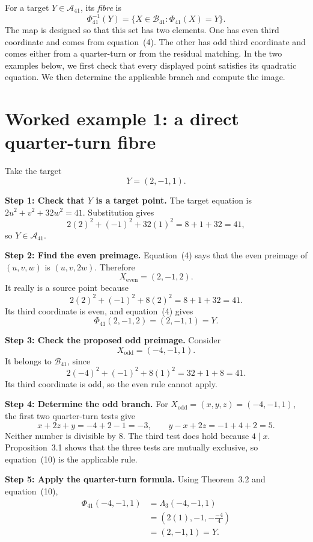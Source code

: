 \documentclass[11pt]{amsart}
\newcommand{\B}{\mathcal B_{41}}
\newcommand{\A}{\mathcal A_{41}}
\newcommand{\PhiMap}{\Phi_{41}}
\begin{document}
For a target \(Y\in\A\), its \emph{fibre} is
\[
 \PhiMap^{-1}(Y)=\{X\in\B:\PhiMap(X)=Y\}.
\]
The map is designed so that this set has two elements.  One has even third
coordinate and comes from equation~(4).  The other has odd third coordinate
and comes either from a quarter-turn or from the residual matching.  In the
two examples below, we first check that every displayed point satisfies its
quadratic equation.  We then determine the applicable branch and compute the
image.

\newpage
\section*{Worked example 1: a direct quarter-turn fibre}

Take the target
\[
 Y=(2,-1,1).
\]

\noindent\textbf{Step 1: Check that \(Y\) is a target point.}
The target equation is \(2u^2+v^2+32w^2=41\).  Substitution gives
\[
 2(2)^2+(-1)^2+32(1)^2=8+1+32=41,
\]
so \(Y\in\A\).

\medskip
\noindent\textbf{Step 2: Find the even preimage.}
Equation~(4) says that the even preimage of \((u,v,w)\) is \((u,v,2w)\).
Therefore
\[
 X_{\mathrm{even}}=(2,-1,2).
\]
It really is a source point because
\[
 2(2)^2+(-1)^2+8(2)^2=8+1+32=41.
\]
Its third coordinate is even, and equation~(4) gives
\[
 \PhiMap(2,-1,2)=(2,-1,1)=Y.
\]

\medskip
\noindent\textbf{Step 3: Check the proposed odd preimage.}
Consider
\[
 X_{\mathrm{odd}}=(-4,-1,1).
\]
It belongs to \(\B\), since
\[
 2(-4)^2+(-1)^2+8(1)^2=32+1+8=41.
\]
Its third coordinate is odd, so the even rule cannot apply.

\medskip
\noindent\textbf{Step 4: Determine the odd branch.}
For \(X_{\mathrm{odd}}=(x,y,z)=(-4,-1,1)\), the first two quarter-turn
tests give
\[
 x+2z+y=-4+2-1=-3,
 \qquad
 y-x+2z=-1+4+2=5.
\]
Neither number is divisible by \(8\).  The third test does hold because
\(4\mid x\).  Proposition~3.1 shows that the three tests are mutually
exclusive, so equation~(10) is the applicable rule.

\medskip
\noindent\textbf{Step 5: Apply the quarter-turn formula.}
Using Theorem~3.2 and equation~(10),
\[
\begin{aligned}
 \PhiMap(-4,-1,1)
   &=\Lambda_3(-4,-1,1)\\
   &=\left(2(1),-1,-\frac{-4}{4}\right)\\
   &=(2,-1,1)=Y.
\end{aligned}
\]
\end{document}
